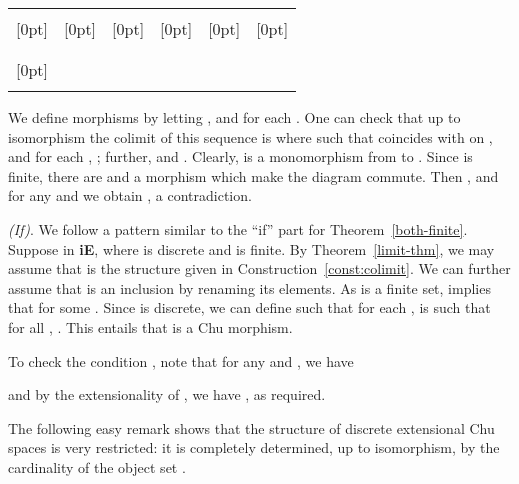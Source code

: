 \documentclass{LMCS}
\let\epf\endproof
\begin{document}
\begin{center}
\begin{tabular}{c c c  c  c  c c c}
& \multicolumn{3}{c}{} &  \multicolumn{4}{c}{} \\  \cline{2-8}
         \raisebox{-1.5ex}[0pt]{}  &     \multicolumn{3}{|c|}{\raisebox{-1.5ex}[0pt]{}} &
                           \multicolumn{1}{|c|}{\raisebox{-1.5ex}[0pt]{}}
                              & \multicolumn{1}{|c|}{\raisebox{-1.5ex}[0pt]{}} &
                             \multicolumn{1}{|c|}{\raisebox{-1.5ex}[0pt]{}}
                                      & \multicolumn{1}{|c|}{\raisebox{-1.5ex}[0pt]{}}  \\
   &       \multicolumn{3}{|c|}{}   &  \multicolumn{1}{|c|}{}  &   \multicolumn{1}{|c|}{} &
                   \multicolumn{1}{|c|}{} &  \multicolumn{1}{|c|}{} \\   \cline{2-8}
       &       \multicolumn{3}{|c|}{}   &  \multicolumn{4}{|c|}{}  \\
\raisebox{0ex}[0pt]{}  &     \multicolumn{3}{|c|}{} &      \multicolumn{4}{c|}{}  \\
& \multicolumn{1}{|c}{}&\multicolumn{1}{c}{}&\multicolumn{1}{c|}{}&   \multicolumn{4}{c|}{}  \\   \cline{2-8}
   \end{tabular}
\end{center}


We define morphisms  by letting ,
 and  for each .  One can check that up to isomorphism the colimit of this
sequence is  where
 such that  coincides with
 on , and  for each , ; further,  and . Clearly,  is a monomorphism from 
to . Since  is finite, there are 
and a morphism  which make the
diagram commute. Then , and for any  and  we obtain ,
a contradiction. 


{\em (If)}.  We follow a pattern  similar to the ``if'' part for
Theorem~\ref{both-finite}.  Suppose  in {\bf iE},
where  is discrete and  is finite. 
By Theorem~\ref{limit-thm},  we may
assume that 
is the structure   given in Construction~\ref{const:colimit}. 
  We can further assume that  is an
inclusion by renaming its elements.  As  is a finite set,  implies that  for some
.  Since  is discrete, we can define  such that for each ,  is
such that for all , . 
This entails that  is a
Chu morphism. 

To check the condition , note
that for any  and , we have


and by the extensionality of , we have , as required. 
\epf


The following easy remark shows that the structure of discrete
extensional Chu spaces  is very restricted: it
is completely determined,  up to isomorphism, by the cardinality of the
object set . 
\end{document}

